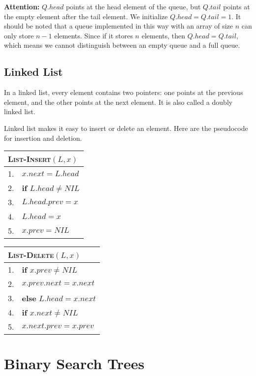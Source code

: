 \documentclass[a4paper,12pt]{article}
\begin{document}
\textbf{Attention:} 
$Q.head$ points at the head element of the queue, but $Q.tail$ points at the empty element after the tail element.
We initialize $Q.head = Q.tail = 1$.
It should be noted that a queue implemented in this way with an array of size $n$ can only store $n - 1$ elements.
Since if it stores $n$ elements, then $Q.head = Q.tail$, which means we cannot distinguish between an empty queue and a full queue.

\subsection{Linked List}

In a linked list, every element contains two pointers: one points at the previous element, and the other points at the next element.
It is also called a doubly linked list.

Linked list makes it easy to insert or delete an element.
Here are the pseudocode for insertion and deletion.

\begin{center}
	\begin{tabular}{rl}
		\toprule
		\multicolumn{2}{l}{\textsc{List-Insert}$(L, x)$} \\
		\midrule
		1. & $x.next = L.head$ \\
		2. & \textbf{if} $L.head \neq NIL$ \\
		3. & \quad $L.head.prev = x$ \\
		4. & $L.head = x$ \\
		5. & $x.prev = NIL$ \\
		\bottomrule
	\end{tabular}
\end{center}

\begin{center}
	\begin{tabular}{rl}
		\toprule
		\multicolumn{2}{l}{\textsc{List-Delete}$(L, x)$} \\
		\midrule
		1. & \textbf{if} $x.prev \neq NIL$ \\
		2. & \quad $x.prev.next = x.next$ \\
		3. & \textbf{else} $L.head = x.next$ \\
		4. & \textbf{if} $x.next \neq NIL$ \\
		5. & \quad $x.next.prev = x.prev$ \\
		\bottomrule
	\end{tabular}
\end{center}

\section{Binary Search Trees}
\end{document}
